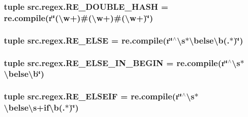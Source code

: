 \hypertarget{namespacesrc_1_1regex_a531e561bc03101f2f529c3542959949f}{
\subsubsection[{R\-E\-\_\-\-D\-O\-U\-B\-L\-E\-\_\-\-H\-A\-S\-H}]{\setlength{\rightskip}{0pt plus 5cm}tuple src.\-regex.\-R\-E\-\_\-\-D\-O\-U\-B\-L\-E\-\_\-\-H\-A\-S\-H = re.\-compile(r\char`\"{}(\textbackslash{}w+)\#(\textbackslash{}w+)\#(\textbackslash{}w+)\char`\"{})}}\label{namespacesrc_1_1regex_a531e561bc03101f2f529c3542959949f}
\hypertarget{namespacesrc_1_1regex_aa8f1435a818c8f3f26b48cb28f084c7a}{
\subsubsection[{R\-E\-\_\-\-E\-L\-S\-E}]{\setlength{\rightskip}{0pt plus 5cm}tuple src.\-regex.\-R\-E\-\_\-\-E\-L\-S\-E = re.\-compile(r\char`\"{}$^\wedge$\textbackslash{}s$\ast$\textbackslash{}belse\textbackslash{}b(.$\ast$)\char`\"{})}}\label{namespacesrc_1_1regex_aa8f1435a818c8f3f26b48cb28f084c7a}
\hypertarget{namespacesrc_1_1regex_a8ccdfb52508f9b6a49082bb4fb1ae188}{
\subsubsection[{R\-E\-\_\-\-E\-L\-S\-E\-\_\-\-I\-N\-\_\-\-B\-E\-G\-I\-N}]{\setlength{\rightskip}{0pt plus 5cm}tuple src.\-regex.\-R\-E\-\_\-\-E\-L\-S\-E\-\_\-\-I\-N\-\_\-\-B\-E\-G\-I\-N = re.\-compile(r\char`\"{}$^\wedge$\textbackslash{}s$\ast$\textbackslash{}belse\textbackslash{}b\char`\"{})}}\label{namespacesrc_1_1regex_a8ccdfb52508f9b6a49082bb4fb1ae188}
\hypertarget{namespacesrc_1_1regex_a0b3c0ae8066bffceca258d02e62f8278}{
\subsubsection[{R\-E\-\_\-\-E\-L\-S\-E\-I\-F}]{\setlength{\rightskip}{0pt plus 5cm}tuple src.\-regex.\-R\-E\-\_\-\-E\-L\-S\-E\-I\-F = re.\-compile(r\char`\"{}$^\wedge$\textbackslash{}s$\ast$\textbackslash{}belse\textbackslash{}s+if\textbackslash{}b(.$\ast$)\char`\"{})}}\label{namespacesrc_1_1regex_a0b3c0ae8066bffceca258d02e62f8278}
